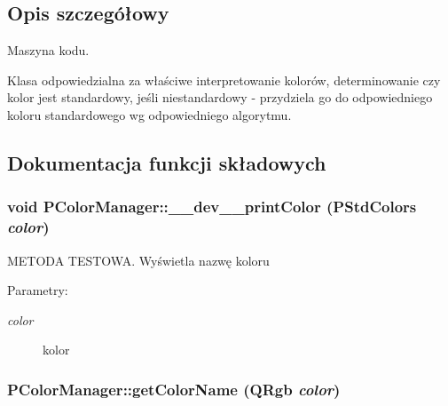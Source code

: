 \subsection{Opis szczegółowy}
Maszyna kodu. 

Klasa odpowiedzialna za właściwe interpretowanie kolorów, determinowanie czy kolor jest standardowy, jeśli niestandardowy - przydziela go do odpowiedniego koloru standardowego wg odpowiedniego algorytmu. 

\subsection{Dokumentacja funkcji składowych}
\hypertarget{classPColorManager_83e07cad55aed7d9133e42a71d514d26}{
\subsubsection[{\_\-\_\-dev\_\-\_\-printColor}]{\setlength{\rightskip}{0pt plus 5cm}void PColorManager::\_\-\_\-dev\_\-\_\-printColor ({\bf PStdColors} {\em color})}}
\label{classPColorManager_83e07cad55aed7d9133e42a71d514d26}


METODA TESTOWA. Wyświetla nazwę koloru \begin{Desc}
\item[Parametry:]
\begin{description}
\item[{\em color}]kolor \end{description}
\end{Desc}
\hypertarget{classPColorManager_27aeb6623eaf527db2d7428ab038958c}{
\subsubsection[{getColorName}]{ PColorManager::getColorName (QRgb {\em color})}}
\label{classPColorManager_27aeb6623eaf527db2d7428ab038958c}


